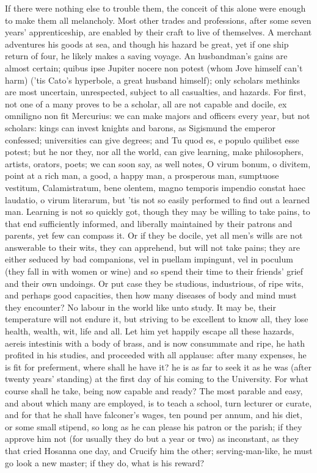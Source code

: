 {{If there were nothing else to trouble them, the conceit of this alone
were enough to make them all melancholy. Most other trades and
professions, after some seven years' apprenticeship, are enabled by
their craft to live of themselves. A merchant adventures his goods at
sea, and though his hazard be great, yet if one ship return of four, he
likely makes a saving voyage. An husbandman's gains are almost certain;
quibus ipse Jupiter nocere non potest (whom Jove himself can't harm)
('tis Cato's hyperbole, a great husband himself); only scholars
methinks are most uncertain, unrespected, subject to all casualties,
and hazards. For first, not one of a many proves to be a scholar, all
are not capable and docile, ex omniligno non fit Mercurius: we
can make majors and officers every year, but not scholars: kings can
invest knights and barons, as Sigismund the emperor confessed;
universities can give degrees; and Tu quod es, e populo quilibet esse
potest; but he nor they, nor all the world, can give learning, make
philosophers, artists, orators, poets; we can soon say, as \Seneca well
notes, O virum bonum, o divitem, point at a rich man, a good, a happy
man, a prosperous man, sumptuose vestitum, Calamistratum, bene olentem,
magno temporis impendio constat haec laudatio, o virum literarum, but
'tis not so easily performed to find out a learned man. Learning is not
so quickly got, though they may be willing to take pains, to that end
sufficiently informed, and liberally maintained by their patrons and
parents, yet few can compass it. Or if they be docile, yet all men's
wills are not answerable to their wits, they can apprehend, but will
not take pains; they are either seduced by bad companions, vel in
puellam impingunt, vel in poculum (they fall in with women or wine) and
so spend their time to their friends' grief and their own undoings. Or
put case they be studious, industrious, of ripe wits, and perhaps good
capacities, then how many diseases of body and mind must they
encounter? No labour in the world like unto study. It may be, their
temperature will not endure it, but striving to be excellent to know
all, they lose health, wealth, wit, life and all. Let him yet happily
escape all these hazards, aereis intestinis with a body of brass, and
is now consummate and ripe, he hath profited in his studies, and
proceeded with all applause: after many expenses, he is fit for
preferment, where shall he have it? he is as far to seek it as he was
(after twenty years' standing) at the first day of his coming to the
University. For what course shall he take, being now capable and ready?
The most parable and easy, and about which many are employed, is to
teach a school, turn lecturer or curate, and for that he shall have
falconer's wages, ten pound per annum, and his diet, or some small
stipend, so long as he can please his patron or the parish; if they
approve him not (for usually they do but a year or two) as inconstant,
as they that cried Hosanna one day, and Crucify him the other;
serving-man-like, he must go look a new master; if they do, what is his
reward?

}}
